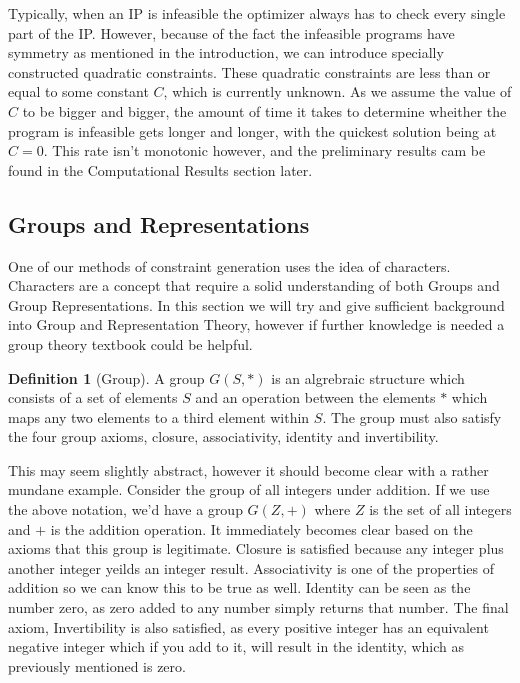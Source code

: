 \documentclass[11pt]{article} %
\theoremstyle{definition}
\newtheorem{definition}[theorem]{Definition}
\theoremstyle{remark}
\begin{document}
Typically, when an IP is infeasible the optimizer always has to check every single part of the IP. However, because of the fact the infeasible programs have symmetry as mentioned in the introduction, we can introduce specially constructed quadratic constraints. These quadratic constraints are less than or equal to some constant $C$, which is currently unknown. As we assume the value of $C$ to be bigger and bigger, the amount of time it takes to determine wheither the program is infeasible gets longer and longer, with the quickest solution being at $C = 0$. This rate isn't monotonic however, and the preliminary results cam be found in the Computational Results section later.

\subsection{Groups and Representations}
One of our methods of constraint generation uses the idea of characters. Characters are a concept that require a solid understanding of both Groups and Group Representations. In this section we will try and give sufficient background into Group and Representation Theory, however if further knowledge is needed a group theory textbook could be helpful.

\begin{definition} [Group]
A group $G(S,*)$ is an algrebraic structure which consists of a set of elements $S$ and an operation between the elements $*$ which maps any two elements to a third element within $S$. The group must also satisfy the four group axioms, closure, associativity, identity and invertibility.
\end{definition}

This may seem slightly abstract, however it should become clear with a rather mundane example. Consider the group of all integers under addition. If we use the above notation, we'd have a group $G(Z, +)$ where $Z$ is the set of all integers and $+$ is the addition operation. It immediately becomes clear based on the axioms that this group is legitimate. Closure is satisfied because any integer plus another integer yeilds an integer result. Associativity is one of the properties of addition so we can know this to be true as well. Identity can be seen as the number zero, as zero added to any number simply returns that number. The final axiom, Invertibility is also satisfied, as every positive integer has an equivalent negative integer which if you add to it, will result in the identity, which as previously mentioned is zero.
\end{document}
